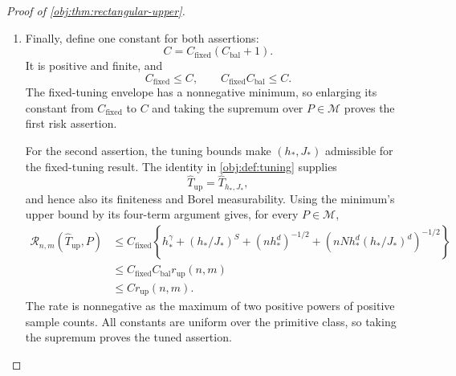 \begin{proof}[Proof of \cref{obj:thm:rectangular-upper}]
\begin{enumerate}
The oracle bandwidth inequality also reads
\[
(n^2)^{-1/(2\Delta_{\mathrm{o}})}
=u_{\mathrm{o}}\le2h_*.
\]
Taking logarithms gives
\[
-\log(n^2)
\le2\Delta_{\mathrm{o}}(\log2+\log h_*).
\]
Using \(2\Delta_{\mathrm{o}}-2d=4\gamma\), we obtain
\[
\begin{aligned}
\log\left((n^2h_*^{2d})^{-1/2}\right)
&=-\frac12\left(\log(n^2)+2d\log h_*\right)\\
&\le\Delta_{\mathrm{o}}\log2+2\gamma\log h_*.
\end{aligned}
\]
Since \(N\ge n\) and \(h_*^{2\gamma}\le h_*^\gamma\),
\[
\begin{aligned}
\left(nNh_*^d(h_*/J_*)^d\right)^{-1/2}
&=(nNh_*^{2d})^{-1/2}\\
&\le(n^2h_*^{2d})^{-1/2}\\
&\le2^{\Delta_{\mathrm{o}}}h_*^{2\gamma}\\
&\le c_{\mathrm{rect}}h_*^\gamma.
\end{aligned}
\]
Thus both cases give admissible tuning and the four-term balance
\[
\begin{gathered}
0<h_*\le\frac12,\qquad 1\le J_*,\\
h_*^\gamma+(h_*/J_*)^S+(nh_*^d)^{-1/2}
+\left(nNh_*^d(h_*/J_*)^d\right)^{-1/2}\\
\le(2+c_{\mathrm{lab}}+c_{\mathrm{rect}})h_*^\gamma
\le C_{\mathrm{bal}}r_{\mathrm{up}}(n,m).
\end{gathered}
\]%

\item Finally, define one constant for both assertions:
\[
C=C_{\mathrm{fixed}}(C_{\mathrm{bal}}+1).
\]
It is positive and finite, and
\[
C_{\mathrm{fixed}}\le C,\qquad
C_{\mathrm{fixed}}C_{\mathrm{bal}}\le C.
\]
The fixed-tuning envelope has a nonnegative minimum, so enlarging its constant from \(C_{\mathrm{fixed}}\) to \(C\) and taking the supremum over \(P\in\mathcal M\) proves the first risk assertion.

For the second assertion, the tuning bounds make
\((h_*,J_*)\) admissible for the fixed-tuning result. The identity in
\cref{obj:def:tuning} supplies
\[
\widehat T_{\mathrm{up}}=\widehat T_{h_*,J_*},
\]
and hence also its finiteness and Borel measurability. Using the minimum's upper bound by its four-term argument gives, for every \(P\in\mathcal M\),
\[
\begin{aligned}
\mathcal R_{n,m}(\widehat T_{\mathrm{up}},P)
&\le C_{\mathrm{fixed}}
 \left\{h_*^\gamma+(h_*/J_*)^S+(nh_*^d)^{-1/2}
 +\left(nNh_*^d(h_*/J_*)^d\right)^{-1/2}\right\}\\
&\le C_{\mathrm{fixed}}C_{\mathrm{bal}}r_{\mathrm{up}}(n,m)\\
&\le Cr_{\mathrm{up}}(n,m).
\end{aligned}
\]
The rate is nonnegative as the maximum of two positive powers of positive sample counts. All constants are uniform over the primitive class, so taking the supremum proves the tuned assertion.%
\end{enumerate}
\end{proof}

